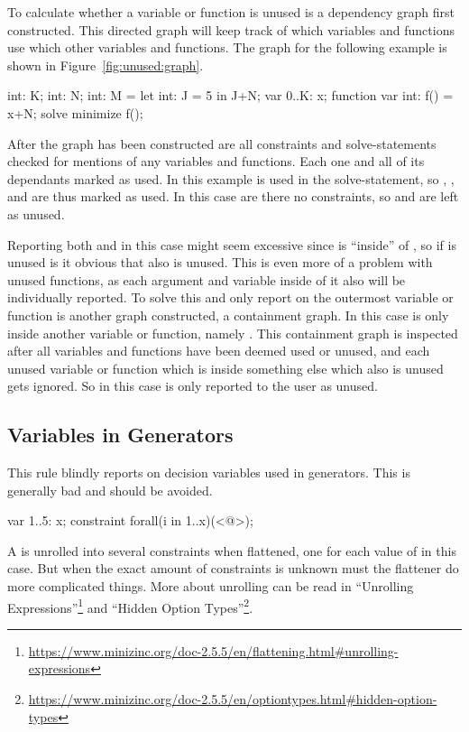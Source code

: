 \documentclass[a4paper,12pt]{article}
\newcommand{\mi}[1]{\mbox{\mzninline{#1}}}
\begin{document}
To calculate whether a variable or function is unused is a dependency graph first
constructed. This directed graph will keep track of which variables and functions use
which other variables and functions. The graph for the following example is shown in
Figure~\ref{fig:unused:graph}.

\begin{mznnobreak}
int: K; int: N;
int: M = let {int: J = 5} in J+N;
var 0..K: x;
function var int: f() = x+N;
solve minimize f();
\end{mznnobreak}



After the graph has been constructed are all constraints and solve-statements checked for
mentions of any variables and functions. Each one and all of its
dependants marked as used. In this example is \mi{f} used in the solve-statement, so
\mi{f}, \mi{N}, \mi{x} and \mi{K} are thus marked as used. In this case are there no
constraints, so \mi{J} and \mi{M} are left as unused.

Reporting both \mi{J} and \mi{M} in this case might seem excessive since \mi{J} is
``inside'' of \mi{M}, so if \mi{M} is unused is it obvious that \mi{J} also is unused.
This is even more of a problem with unused functions, as each argument and variable inside
of it also will be individually reported. To solve this and only report on the outermost
variable or function is another graph constructed, a containment graph. In this case is
only \mi{J} inside another variable or function, namely \mi{M}. This containment graph is
inspected after all variables and functions have been deemed used or unused, and each
unused variable or function which is inside something else which also is unused gets
ignored. So in this case is only \mi{M} reported to the user as unused.

\subsection{Variables in Generators}\label{sec:rule:vargen}
This rule blindly reports on decision variables used in generators. This is generally
bad and should be avoided.

\begin{mznnobreak}
var 1..5: x;
constraint forall(i in 1..x)(<@\dots@>);
\end{mznnobreak}

A \mi{forall} is unrolled into several constraints when flattened, one for each
value of \mi{i} in this case. But when the exact amount of constraints is unknown must the
flattener do more complicated things. More about unrolling can be read in ``Unrolling
Expressions''\footnote{\url{https://www.minizinc.org/doc-2.5.5/en/flattening.html\#unrolling-expressions}}
and ``Hidden Option Types''\footnote{\url{https://www.minizinc.org/doc-2.5.5/en/optiontypes.html\#hidden-option-types}}.
\end{document}
